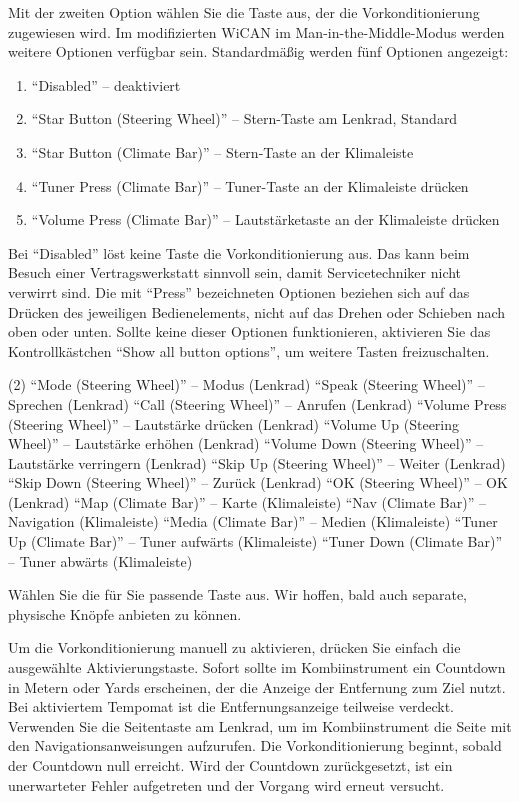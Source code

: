 \documentclass[superscriptaddress,onecolumn,floatfix]{revtex4-2}
\begin{document}
Mit der zweiten Option wählen Sie die Taste aus, der die Vorkonditionierung zugewiesen wird. Im modifizierten WiCAN im Man-in-the-Middle-Modus werden weitere Optionen verfügbar sein. Standardmäßig werden fünf Optionen angezeigt:
\begin{enumerate}
  \item ``Disabled'' -- deaktiviert
  \item ``Star Button (Steering Wheel)'' -- Stern-Taste am Lenkrad, Standard
  \item ``Star Button (Climate Bar)'' -- Stern-Taste an der Klimaleiste
  \item ``Tuner Press (Climate Bar)'' -- Tuner-Taste an der Klimaleiste drücken
  \item ``Volume Press (Climate Bar)'' -- Lautstärketaste an der Klimaleiste drücken
\end{enumerate}
Bei ``Disabled'' löst keine Taste die Vorkonditionierung aus. Das kann beim Besuch einer Vertragswerkstatt sinnvoll sein, damit Servicetechniker nicht verwirrt sind. Die mit ``Press'' bezeichneten Optionen beziehen sich auf das Drücken des jeweiligen Bedienelements, nicht auf das Drehen oder Schieben nach oben oder unten. Sollte keine dieser Optionen funktionieren, aktivieren Sie das Kontrollkästchen ``Show all button options'', um weitere Tasten freizuschalten.
\begin{tasks}(2)
  \task ``Mode (Steering Wheel)'' -- Modus (Lenkrad)
  \task ``Speak (Steering Wheel)'' -- Sprechen (Lenkrad)
  \task ``Call (Steering Wheel)'' -- Anrufen (Lenkrad)
  \task ``Volume Press (Steering Wheel)'' -- Lautstärke drücken (Lenkrad)
  \task ``Volume Up (Steering Wheel)'' -- Lautstärke erhöhen (Lenkrad)
  \task ``Volume Down (Steering Wheel)'' -- Lautstärke verringern (Lenkrad)
  \task ``Skip Up (Steering Wheel)'' -- Weiter (Lenkrad)
  \task ``Skip Down (Steering Wheel)'' -- Zurück (Lenkrad)
  \task ``OK (Steering Wheel)'' -- OK (Lenkrad)
  \task ``Map (Climate Bar)'' -- Karte (Klimaleiste)
  \task ``Nav (Climate Bar)'' -- Navigation (Klimaleiste)
  \task ``Media (Climate Bar)'' -- Medien (Klimaleiste)
  \task ``Tuner Up (Climate Bar)'' -- Tuner aufwärts (Klimaleiste)
  \task ``Tuner Down (Climate Bar)'' -- Tuner abwärts (Klimaleiste)
\end{tasks}
Wählen Sie die für Sie passende Taste aus. Wir hoffen, bald auch separate, physische Knöpfe anbieten zu können.

Um die Vorkonditionierung manuell zu aktivieren, drücken Sie einfach die ausgewählte Aktivierungstaste. Sofort sollte im Kombiinstrument ein Countdown in Metern oder Yards erscheinen, der die Anzeige der Entfernung zum Ziel nutzt. Bei aktiviertem Tempomat ist die Entfernungsanzeige teilweise verdeckt. Verwenden Sie die Seitentaste am Lenkrad, um im Kombiinstrument die Seite mit den Navigationsanweisungen aufzurufen. Die Vorkonditionierung beginnt, sobald der Countdown null erreicht. Wird der Countdown zurückgesetzt, ist ein unerwarteter Fehler aufgetreten und der Vorgang wird erneut versucht.
\end{document}
